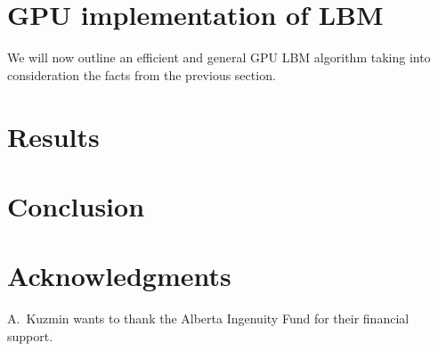 \documentclass[mathpazo]{cicp}
\begin{document}
\section{GPU implementation of LBM}

We will now outline an efficient and general GPU LBM algorithm taking into consideration
the facts from the previous section.

\section{Results}
\label{sec:benchmark}

\section{Conclusion}
\section*{Acknowledgments}
A.~Kuzmin wants to thank the Alberta Ingenuity Fund for their financial support.




\end{document}
